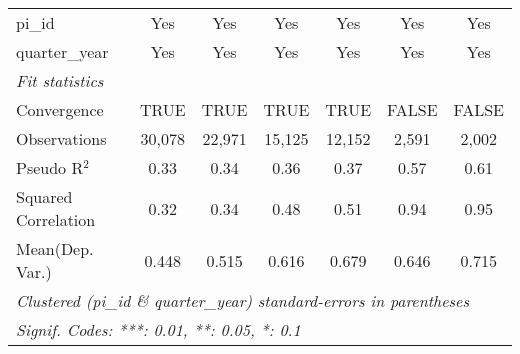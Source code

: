 \begin{tabular}{lcccccc}
   pi\_id                                                     & Yes           & Yes           & Yes           & Yes           & Yes           & Yes\\  
   quarter\_year                                              & Yes           & Yes           & Yes           & Yes           & Yes           & Yes\\  
   \midrule
   \emph{Fit statistics}\\
   Convergence                                                &TRUE           & TRUE          & TRUE          & TRUE          & FALSE         & FALSE\\  
   Observations                                               & 30,078        & 22,971        & 15,125        & 12,152        & 2,591         & 2,002\\  
   Pseudo R$^2$                                               & 0.33          & 0.34          & 0.36          & 0.37          & 0.57          & 0.61\\  
   Squared Correlation                                        & 0.32          & 0.34          & 0.48          & 0.51          & 0.94          & 0.95\\  
Mean(Dep. Var.) & 0.448 & 0.515 & 0.616 & 0.679 & 0.646 & 0.715 \\
   \midrule \midrule
   \multicolumn{7}{l}{\emph{Clustered (pi\_id \& quarter\_year) standard-errors in parentheses}}\\
   \multicolumn{7}{l}{\emph{Signif. Codes: ***: 0.01, **: 0.05, *: 0.1}}\\
\end{tabular}
\par\endgroup
